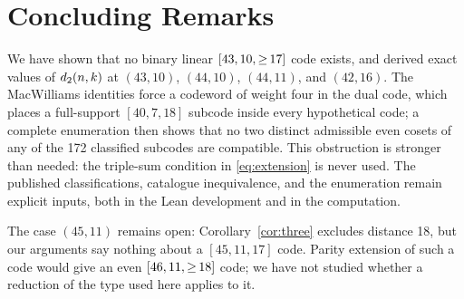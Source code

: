 \vspace{8pt}
\section{Concluding Remarks}
\label{sec:conclusion}
We have shown that no binary linear $\mbox{\ensuremath{[43,10,{\ge}\,17]}}$ code exists, and derived exact values of $d_2(n,k)$ at $(43,10)$, $(44,10)$, $(44,11)$, and $(42,16)$. The MacWilliams identities force a codeword of weight four in the dual code, which places a full-support $[40,7,18]$ subcode inside every hypothetical code; a complete enumeration then shows that no two distinct admissible even cosets of any of the 172 classified subcodes are compatible. This obstruction is stronger than needed: the triple-sum condition in \eqref{eq:extension} is never used. The published classifications, catalogue inequivalence, and the enumeration remain explicit inputs, both in the Lean development and in the computation.

\vspace{8pt}
The case $(45,11)$ remains open: Corollary~\ref{cor:three} excludes distance 18, but our arguments say nothing about a $[45,11,17]$ code. Parity extension of such a code would give an even $\mbox{\ensuremath{[46,11,{\ge}\,18]}}$ code; we have not studied whether a reduction of the type used here applies to it.
